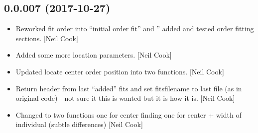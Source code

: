 \documentclass[a4paper,10pt,english]{report}
\begin{document}
\subsection{0.0.007 (2017-10-27)}
\label{\detokenize{misc/changelog:id543}}\begin{itemize}
\item {} 
Reworked fit order into “initial order fit” and ”
added and tested order fitting sections. {[}Neil Cook{]}

\item {} 
Added some more location parameters. {[}Neil Cook{]}

\item {} 
Updated locate center order position into two functions. {[}Neil Cook{]}

\item {} 
Return header from last “added” fits and set fitsfilename to last file
(as in original code) - not sure it this is wanted but it is how it
is. {[}Neil Cook{]}

\item {} 
Changed  to two functions one for center
finding one for center + width of individual (subtle differences)
{[}Neil Cook{]}

\end{itemize}
\end{document}
